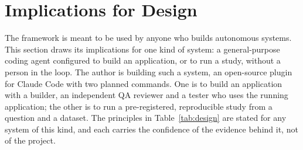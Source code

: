 \section{Implications for Design}\label{sec:design}

The framework is meant to be used by anyone who builds autonomous systems. This section draws its implications for one kind of system: a general-purpose coding agent configured to build an application, or to run a study, without a person in the loop. The author is building such a system, an open-source plugin for Claude Code with two planned commands. One is to build an application with a builder, an independent QA reviewer and a tester who uses the running application; the other is to run a pre-registered, reproducible study from a question and a dataset. The principles in Table~\ref{tab:design} are stated for any system of this kind, and each carries the confidence of the evidence behind it, not of the project.

